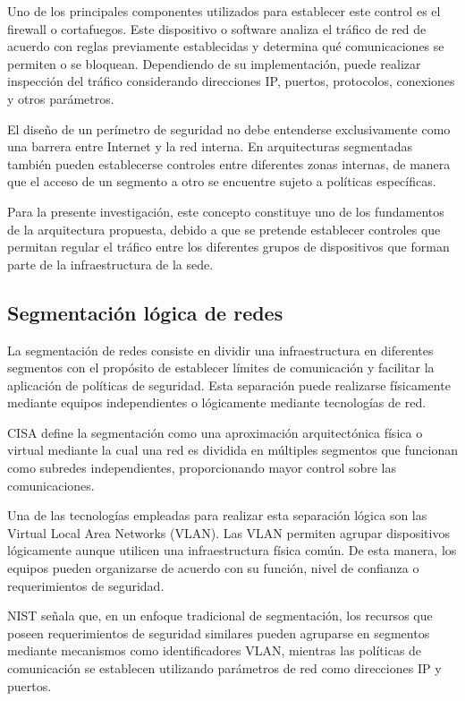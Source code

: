Uno de los principales componentes utilizados para establecer este control es el firewall o cortafuegos. Este dispositivo o software analiza el tráfico de red de acuerdo con reglas previamente establecidas y determina qué comunicaciones se permiten o se bloquean. Dependiendo de su implementación, puede realizar inspección del tráfico considerando direcciones IP, puertos, protocolos, conexiones y otros parámetros.

El diseño de un perímetro de seguridad no debe entenderse exclusivamente como una barrera entre Internet y la red interna. En arquitecturas segmentadas también pueden establecerse controles entre diferentes zonas internas, de manera que el acceso de un segmento a otro se encuentre sujeto a políticas específicas.

Para la presente investigación, este concepto constituye uno de los fundamentos de la arquitectura propuesta, debido a que se pretende establecer controles que permitan regular el tráfico entre los diferentes grupos de dispositivos que forman parte de la infraestructura de la sede.

\subsection{Segmentación lógica de redes}

La segmentación de redes consiste en dividir una infraestructura en diferentes segmentos con el propósito de establecer límites de comunicación y facilitar la aplicación de políticas de seguridad. Esta separación puede realizarse físicamente mediante equipos independientes o lógicamente mediante tecnologías de red.



CISA define la segmentación como una aproximación arquitectónica física o virtual mediante la cual una red es dividida en múltiples segmentos que funcionan como subredes independientes, proporcionando mayor control sobre las comunicaciones.

Una de las tecnologías empleadas para realizar esta separación lógica son las Virtual Local Area Networks (VLAN). Las VLAN permiten agrupar dispositivos lógicamente aunque utilicen una infraestructura física común. De esta manera, los equipos pueden organizarse de acuerdo con su función, nivel de confianza o requerimientos de seguridad.

NIST señala que, en un enfoque tradicional de segmentación, los recursos que poseen requerimientos de seguridad similares pueden agruparse en segmentos mediante mecanismos como identificadores VLAN, mientras las políticas de comunicación se establecen utilizando parámetros de red como direcciones IP y puertos.

